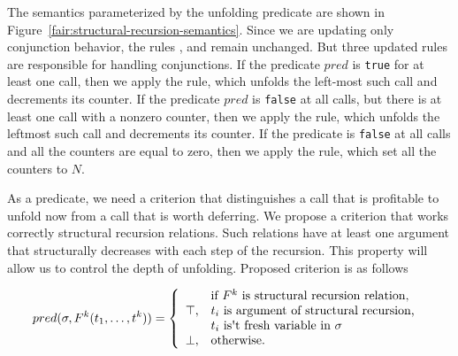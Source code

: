 The semantics parameterized by the unfolding predicate are shown in Figure~\ref{fair:structural-recursion-semantics}. Since we are updating only conjunction behavior, the rules ,  and  remain unchanged. But three updated rules are responsible for handling conjunctions. If the predicate $pred$ is \lstinline{true} for at least one call, then we apply the  rule, which unfolds the left-most such call and decrements its counter. If the predicate $pred$ is \lstinline{false} at all calls, but there is at least one call with a nonzero counter, then we apply the  rule, which unfolds the leftmost such call and decrements its counter. If the predicate is \lstinline{false} at all calls and all the counters are equal to zero, then we apply the  rule, which set all the counters to $N$.

As a predicate, we need a criterion that distinguishes a call that is profitable to unfold now from a call that is worth deferring. We propose a criterion that works correctly structural recursion relations. Such relations have at least one argument that structurally decreases with each step of the recursion. This property will allow us to control the depth of unfolding. Proposed criterion is as follows

\[
pred(\sigma, F^k(t_1, \ldots, t^k)) = \left\{
\begin{array}{cl}
      & \mbox{if } F^k \mbox{ is structural recursion relation, } \\
\top, & t_i \mbox { is argument of structural recursion, } \\
      & t_i \mbox { is\textquotesingle t fresh variable in } \sigma \\
\bot, & \mbox{otherwise.}
\end{array}
\right.
\]

